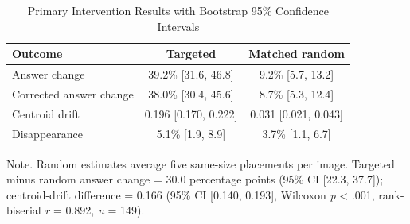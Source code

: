 \begin{table}[t]
\centering
\caption{Primary Intervention Results with Bootstrap 95\% Confidence Intervals}
\label{tab:primary-results}
\begin{tabular}{@{}lcc@{}}
\toprule
Outcome & Targeted & Matched random \\
\midrule
Answer change & 39.2\% [31.6, 46.8] & 9.2\% [5.7, 13.2] \\
Corrected answer change & 38.0\% [30.4, 45.6] & 8.7\% [5.3, 12.4] \\
Centroid drift & 0.196 [0.170, 0.222] & 0.031 [0.021, 0.043] \\
Disappearance & 5.1\% [1.9, 8.9] & 3.7\% [1.1, 6.7] \\
\bottomrule
\end{tabular}
\begin{minipage}{0.94\linewidth}
\vspace{2pt}\footnotesize Note. Random estimates average five same-size placements per image. Targeted minus random answer change = 30.0 percentage points (95\% CI [22.3, 37.7]); centroid-drift difference = 0.166 (95\% CI [0.140, 0.193], Wilcoxon \textit{p} < .001, rank-biserial \textit{r} = 0.892, \textit{n} = 149).
\end{minipage}
\end{table}
